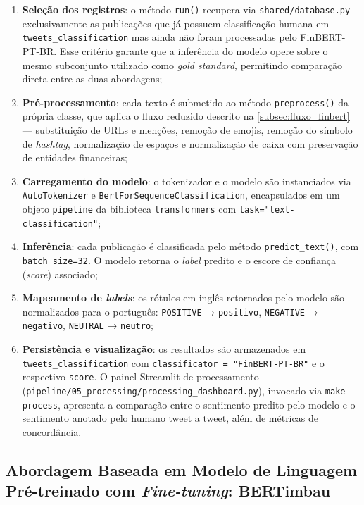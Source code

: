 \begin{enumerate}
	\item \textbf{Seleção dos registros}: o método \texttt{run()} recupera via \texttt{shared/database.py} exclusivamente as publicações que já possuem classificação humana em \texttt{tweets\_classification} mas ainda não foram processadas pelo FinBERT-PT-BR. Esse critério garante que a inferência do modelo opere sobre o mesmo subconjunto utilizado como \textit{gold standard}, permitindo comparação direta entre as duas abordagens;
	
	\item \textbf{Pré-processamento}: cada texto é submetido ao método \texttt{preprocess()} da própria classe, que aplica o fluxo reduzido descrito na \autoref{subsec:fluxo_finbert} — substituição de URLs e menções, remoção de emojis, remoção do símbolo de \textit{hashtag}, normalização de espaços e normalização de caixa com preservação de entidades financeiras;
	
	\item \textbf{Carregamento do modelo}: o tokenizador e o modelo são instanciados via \texttt{AutoTokenizer} e \texttt{BertForSequenceClassification}, encapsulados em um objeto \texttt{pipeline} da biblioteca \texttt{transformers} com \texttt{task="text-classification"};
	
	\item \textbf{Inferência}: cada publicação é classificada pelo método \texttt{predict\_text()}, com \texttt{batch\_size=32}. O modelo retorna o \textit{label} predito e o escore de confiança (\textit{score}) associado;
	
	\item \textbf{Mapeamento de \textit{labels}}: os rótulos em inglês retornados pelo modelo são normalizados para o português: \texttt{POSITIVE} → \texttt{positivo}, 	\texttt{NEGATIVE} → \texttt{negativo}, \texttt{NEUTRAL} → \texttt{neutro};
	
	\item \textbf{Persistência e visualização}: os resultados são armazenados em \texttt{tweets\_classification} com \texttt{classificator = "FinBERT-PT-BR"} e o respectivo
	\texttt{score}. O painel Streamlit de processamento (\texttt{pipeline/05\_processing/processing\_dashboard.py}), invocado via \texttt{make process}, apresenta a comparação entre o sentimento predito pelo modelo e o sentimento anotado pelo humano tweet a tweet, além de métricas de concordância.
\end{enumerate}

\subsection{Abordagem Baseada em Modelo de Linguagem Pré-treinado com \textit{Fine-tuning}: BERTimbau}
\label{subsec:bertimbau}

